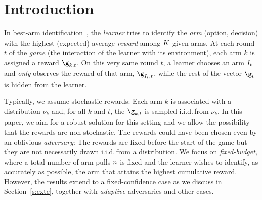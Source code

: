 \section{Introduction}
In best-arm identification~\citep{Maron93HR,Bubeck09PE}, 
the \emph{learner} tries to identify the \emph{arm} (option,
decision) with the highest (expected) average \emph{reward} among $K$
given arms.  At each round $t$ of the \emph{game} (the interaction
of the learner with its environment), each arm $k$ is assigned a
reward $\gainVector_{k,t}$. On this very same round $t$, a learner
chooses an arm $I_t$ and \emph{only} observes the reward of
that arm, $\gainVector_{\pulledArm_t,t}$, while the rest of the vector
$\gainVector_{t}$ is hidden from the learner.

Typically, we assume stochastic rewards: Each arm $k$ is associated with
a distribution $\nu_k$ and, for all $k$ and $t$, the
$\gainVector_{k,t}$ is sampled i.i.d.\,from $\nu_k$. In this paper, we
aim for a robust solution for this setting and we allow the possibility
that the rewards are non-stochastic. The rewards could  have been chosen even by an oblivious \emph{adversary}: The
rewards are fixed before the start of the game but they are not necessarily
drawn i.i.d.\,from a distribution. We focus on \emph{fixed-budget}, where a
total number of arm pulls $n$ is fixed and the learner
wishes to identify, as accurately as possible, the arm that attains the
highest cumulative reward. However, the results extend to a fixed-confidence 
case as we discuss in Section~\ref{s:exte}, together with \textit{adaptive} 
adversaries and other cases. %


